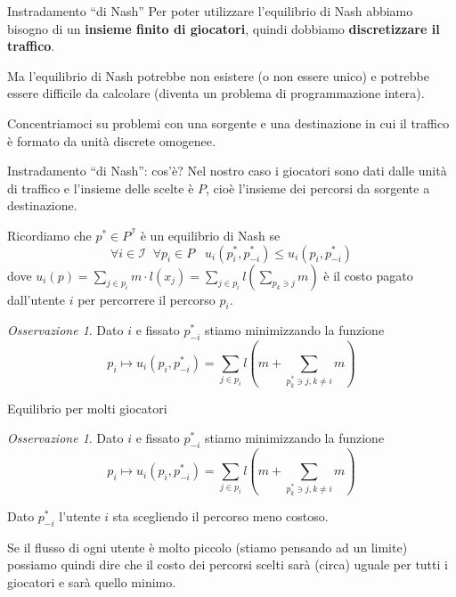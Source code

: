 \documentclass{beamer}
\newcounter{counter1}
\theoremstyle{plain}
\theoremstyle{definition}
\theoremstyle{remark}
\newtheorem{myoss}[counter1]{Osservazione}
\newcommand{\pa}[1]{\left(#1\right)}
\begin{document}
\begin{frame}{Instradamento ``di Nash''}
  Per poter utilizzare l'equilibrio di Nash abbiamo bisogno di un
  \textbf{insieme finito di giocatori}, quindi dobbiamo
  \textbf{discretizzare il traffico}.

  Ma l'equilibrio di Nash potrebbe non esistere (o non essere unico) e
  potrebbe essere difficile da calcolare (diventa un problema di
  programmazione intera).  \vfill

  Concentriamoci su problemi con una sorgente e una destinazione in
  cui il traffico è formato da unità discrete omogenee.
\end{frame}

\begin{frame}{Instradamento ``di Nash'': cos'è?}
  Nel nostro caso i giocatori sono dati dalle unità di traffico e
  l'insieme delle scelte è $P$, cioè l'insieme dei percorsi da
  sorgente a destinazione.
  \vfill
  
  Ricordiamo che $p^* \in P^{\mathcal{I}}$ è un equilibrio di Nash se
  \[ \forall i\in \mathcal{I}\;\; \forall p_i \in P \;\;\;
    u_i\pa{p^*_i,p^*_{-i}} \le u_i\pa{p_i,p^*_{-i}} \] dove
  $u_i\pa{p} = \sum _{j\in p_i} m\cdot l(x_j) = \sum_{j\in p_i} l \pa{
    \sum _{p_k \ni j} m}$ è il costo pagato dall'utente $i$ per
  percorrere il percorso $p_i$.

  \begin{myoss}
    Dato $i$ e fissato $p^*_{-i}$ stiamo minimizzando la funzione
    \[ p_i \longmapsto u_i\pa{p_i,p^*_{-i}} = \sum_{j\in p_i} l \pa{ m
        + \sum _{p^*_k \ni j, k\neq i} m}\]
  \end{myoss}
\end{frame}

\begin{frame}{Equilibrio per molti giocatori}
  \begin{myoss}
    Dato $i$ e fissato $p^*_{-i}$ stiamo minimizzando la funzione
    \[ p_i \longmapsto u_i\pa{p_i,p^*_{-i}} = \sum_{j\in p_i} l \pa{ m
        + \sum _{p^*_k \ni j, k\neq i} m}\]
  \end{myoss}
  Dato $p^*_{-i}$ l'utente $i$ sta scegliendo il percorso meno
  costoso.
  \vfill
  
  Se il flusso di ogni utente è molto piccolo (stiamo pensando ad un
  limite) possiamo quindi dire che il costo dei percorsi scelti sarà
  (circa) uguale per tutti i giocatori e sarà quello minimo.
\end{frame}
\end{document}
